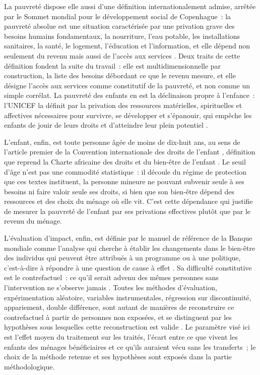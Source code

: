 La pauvreté dispose elle aussi d'une définition internationalement
admise, arrêtée par le Sommet mondial pour le développement social de
Copenhague~: la pauvreté absolue est une situation caractérisée par une
privation grave des besoins humains fondamentaux, la nourriture, l'eau
potable, les installations sanitaires, la santé, le logement, l'éducation
et l'information, et elle dépend non seulement du revenu mais aussi de
l'accès aux services \parencite{onu1995}. Deux traits de cette définition
fondent la suite du travail~: elle est multidimensionnelle par construction,
la liste des besoins débordant ce que le revenu mesure, et elle désigne
l'accès aux services comme constitutif de la pauvreté, et non comme un
simple corrélat. La pauvreté des enfants en est la déclinaison propre à
l'enfance~: l'UNICEF la définit par la privation des ressources
matérielles, spirituelles et affectives nécessaires pour survivre, se
développer et s'épanouir, qui empêche les enfants de jouir de leurs droits
et d'atteindre leur plein potentiel \parencite{unicef2007, gordon2003}.

L'enfant, enfin, est toute personne âgée de moins de dix-huit ans, au
sens de l'article premier de la Convention internationale des droits de
l'enfant \parencite{onu1989}, définition que reprend la Charte africaine
des droits et du bien-être de l'enfant \parencite{oua1990}. Le seuil
d'âge n'est pas une commodité statistique~: il découle du régime de
protection que ces textes instituent, la personne mineure ne pouvant
subvenir seule à ses besoins ni faire valoir seule ses droits, si bien que
son bien-être dépend des ressources et des choix du ménage où elle vit.
C'est cette dépendance qui justifie de mesurer la pauvreté de l'enfant par
ses privations effectives plutôt que par le revenu du ménage.

L'évaluation d'impact, enfin, est définie par le manuel de référence de
la Banque mondiale comme l'analyse qui cherche à établir les changements
dans le bien-être des individus qui peuvent être attribués à un programme
ou à une politique, c'est-à-dire à répondre à une question de cause à
effet \parencite{gertler2016}. Sa difficulté constitutive est le
contrefactuel~: ce qu'il serait advenu des mêmes personnes sans
l'intervention ne s'observe jamais \parencite{heckman1997}. Toutes les
méthodes d'évaluation, expérimentation aléatoire, variables
instrumentales, régression sur discontinuité, appariement, double
différence, sont autant de manières de reconstruire ce contrefactuel à
partir de personnes non exposées, et se distinguent par les hypothèses
sous lesquelles cette reconstruction est valide
\parencite{angrist2009}. Le paramètre visé ici est l'effet moyen du
traitement sur les traités, l'écart entre ce que vivent les enfants des
ménages bénéficiaires et ce qu'ils auraient vécu sans les transferts~;
le choix de la méthode retenue et ses hypothèses sont exposés dans la
partie méthodologique.

